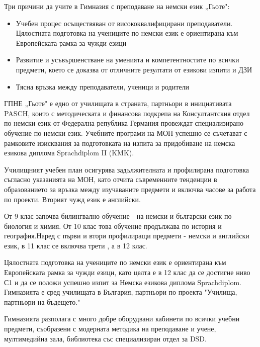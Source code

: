 \begin{center}
Три причини да учите в Гимназия с преподаване на немски език „Гьоте":
\end{center}


\begin{itemize}
 \item Учебен процес осъществяван от висококвалифицирани преподаватели. Цялостната подготовка на учениците по немски език е ориентирана към Европейската рамка за чужди езици

 \item Развитие и усъвършенстване на уменията и компетентностите по всички предмети, което се доказва от отличните резултати от езикови изпити и ДЗИ

 \item Тясна връзка между преподаватели, ученици и родители

\end{itemize}

ГПНЕ „Гьоте" е едно от училищата в страната, партньори в инициативата PASCH, които с методическата и финансова подкрепа на Консултантския отдел по немски език от Федерална република Германия провеждат специализирано обучение по немски език. Учебните програми на МОН успешно се съчетават с рамковите изисквания за подготовката на изпита за придобиване на немска езикова диплома Sprachdiplom II (KMK).

Училищният учебен план осигурява задължителната и профилирана подготовка съгласно указанията на МОН, като отчита съвременните тенденции в образованието за връзка между изучаваните предмети и включва часове за работа по проекти. Вторият чужд език е английски. 

От 9 клас започва билингвално обучение - на немски и български език по биология и  химия. От 10 клас това обучение продължава по история и география.Наред с първи и втори профилиращи предмети - немски и английски език, в 11 клас се включва трети , а в 12 клас. 

Цялостната подготовка на учениците по немски език е ориентирана към Европейската рамка за чужди езици, като целта е в 12 клас да се достигне ниво С1 и да се положи успешно изпит за Немска езикова диплома Sprachdiplom. Гимназията е сред училищата в България, партньори по проекта "Училища, партньори на бъдещето."

Гимназията разполага с много добре оборудвани кабинети по всички учебни предмети, съобразени с модерната методика на преподаване и учене, мултимедийна зала, библиотека със специализиран отдел за DSD.  

